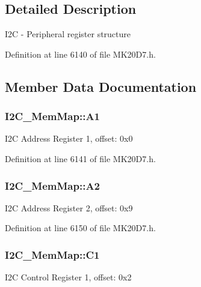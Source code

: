 \subsection{Detailed Description}
I2C -\/ Peripheral register structure 

Definition at line 6140 of file M\+K20\+D7.\+h.



\subsection{Member Data Documentation}
\subsubsection[{\texorpdfstring{A1}{A1}}]{ I2\+C\+\_\+\+Mem\+Map\+::\+A1}\hypertarget{struct_i2_c___mem_map_aefc602e5555ff9807f66ba8d67c214c0}{}\label{struct_i2_c___mem_map_aefc602e5555ff9807f66ba8d67c214c0}
I2C Address Register 1, offset\+: 0x0 

Definition at line 6141 of file M\+K20\+D7.\+h.

\subsubsection[{\texorpdfstring{A2}{A2}}]{ I2\+C\+\_\+\+Mem\+Map\+::\+A2}\hypertarget{struct_i2_c___mem_map_ad4e4dbcd884a2b52af7dbef17817f12e}{}\label{struct_i2_c___mem_map_ad4e4dbcd884a2b52af7dbef17817f12e}
I2C Address Register 2, offset\+: 0x9 

Definition at line 6150 of file M\+K20\+D7.\+h.

\subsubsection[{\texorpdfstring{C1}{C1}}]{ I2\+C\+\_\+\+Mem\+Map\+::\+C1}\hypertarget{struct_i2_c___mem_map_a211af10ff66759da8bd2712f3d26ad8a}{}\label{struct_i2_c___mem_map_a211af10ff66759da8bd2712f3d26ad8a}
I2C Control Register 1, offset\+: 0x2 

